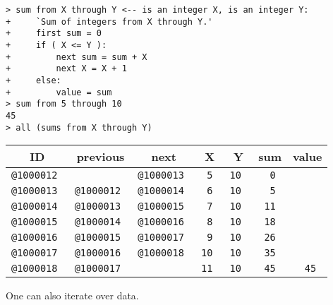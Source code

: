 \documentclass[12pt]{article}
\newenvironment{indpar}[1][0.3in]%
	{\begin{list}{}%
		     {\setlength{\itemsep}{0in}%
		      \setlength{\topsep}{0in}%
		      \setlength{\parsep}{1ex}%
		      \setlength{\labelwidth}{#1}%
		      \setlength{\leftmargin}{#1}%
		      \addtolength{\leftmargin}{\labelsep}}%
	 \item}%
	{\end{list}}
\begin{document}
\begin{indpar}
\verb|> sum from X through Y <-- is an integer X, is an integer Y:| \\
\verb|+     `Sum of integers from X through Y.'| \\
\verb|+     first sum = 0| \\
\verb|+     if ( X <= Y ):| \\
\verb|+         next sum = sum + X| \\
\verb|+         next X = X + 1| \\
\verb|+     else:| \\
\verb|+         value = sum| \\
\verb|> sum from 5 through 10| \\
\verb|45| \\
\verb|> all (sums from X through Y)| \\
\begin{tabular}{|r|r|r|r|r|r|r|}
\hline
\multicolumn{1}{|c}{\bf ID} &
\multicolumn{1}{|c}{\bf previous} &
\multicolumn{1}{|c}{\bf next} &
\multicolumn{1}{|c}{\bf X} &
\multicolumn{1}{|c}{\bf Y} &
\multicolumn{1}{|c}{\bf sum} &
\multicolumn{1}{|c|}{\bf value} \\
\hline
\tt @1000012 &              & \tt @1000013
	     & \tt 5	& \tt 10   & \tt 0	& \\
\tt @1000013 & \tt @1000012 & \tt @1000014
	     & \tt 6	& \tt 10   & \tt 5	& \\
\tt @1000014 & \tt @1000013 & \tt @1000015
	     & \tt 7	& \tt 10   & \tt 11	& \\
\tt @1000015 & \tt @1000014 & \tt @1000016
	     & \tt 8	& \tt 10   & \tt 18	& \\
\tt @1000016 & \tt @1000015 & \tt @1000017
	     & \tt 9	& \tt 10   & \tt 26	& \\
\tt @1000017 & \tt @1000016 & \tt @1000018
	     & \tt 10	& \tt 10   & \tt 35	& \\
\tt @1000018 & \tt @1000017 &
	     & \tt 11	& \tt 10   & \tt 45	& \tt 45 \\
\hline
\end{tabular}
\end{indpar}

One can also iterate over data.
\end{document}
